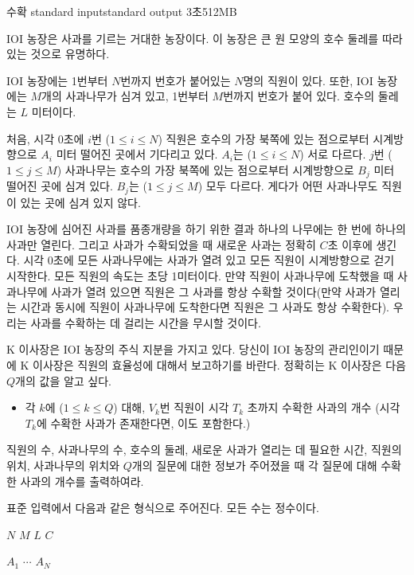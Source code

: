 \begin{problem}{수확}
	{standard input}{standard output}
	{3초}{512MB}{}
	
	IOI 농장은 사과를 기르는 거대한 농장이다. 이 농장은 큰 원 모양의 호수 둘레를 따라 있는 것으로 유명하다.
	
	IOI 농장에는 1번부터 $N$번까지 번호가 붙어있는 $N$명의 직원이 있다. 또한, IOI 농장에는 $M$개의 사과나무가 심겨 있고, 1번부터 $M$번까지 번호가 붙어 있다. 호수의 둘레는 $L$ 미터이다.
	
	처음, 시각 0초에 $i$번 ($1 \le i \le N$) 직원은 호수의 가장 북쪽에 있는 점으로부터 시계방향으로 $A_i$ 미터 떨어진 곳에서 기다리고 있다. $A_i$는 ($1 \le i \le N$) 서로 다르다. $j$번 ($1 \le j \le M$) 사과나무는 호수의 가장 북쪽에 있는 점으로부터 시계방향으로 $B_j$ 미터 떨어진 곳에 심겨 있다. $B_j$는 ($1 \le j \le M$) 모두 다르다. 게다가 어떤 사과나무도 직원이 있는 곳에 심겨 있지 않다.
	
	IOI 농장에 심어진 사과를 품종개량을 하기 위한 결과 하나의 나무에는 한 번에 하나의 사과만 열린다. 그리고 사과가 수확되었을 때 새로운 사과는 정확히 $C$초 이후에 생긴다. 시각 0초에 모든 사과나무에는 사과가 열려 있고 모든 직원이 시계방향으로 걷기 시작한다. 모든 직원의 속도는 초당 1미터이다. 만약 직원이 사과나무에 도착했을 때 사과나무에 사과가 열려 있으면 직원은 그 사과를 항상 수확할 것이다(만약 사과가 열리는 시간과 동시에 직원이 사과나무에 도착한다면 직원은 그 사과도 항상 수확한다). 우리는 사과를 수확하는 데 걸리는 시간을 무시할 것이다.
	
	K 이사장은 IOI 농장의 주식 지분을 가지고 있다. 당신이 IOI 농장의 관리인이기 때문에 K 이사장은 직원의 효율성에 대해서 보고하기를 바란다. 정확히는 K 이사장은 다음 $Q$개의 값을 알고 싶다.
	
	\begin{itemize}
		\item[] 각 $k$에 ($1 \le k \le Q$) 대해, $V_k$번 직원이 시각 $T_k$ 초까지 수확한 사과의 개수 (시각 $T_k$에 수확한 사과가 존재한다면, 이도 포함한다.)
	\end{itemize}
	
	직원의 수, 사과나무의 수, 호수의 둘레, 새로운 사과가 열리는 데 필요한 시간, 직원의 위치, 사과나무의 위치와 $Q$개의 질문에 대한 정보가 주어졌을 때 각 질문에 대해 수확한 사과의 개수를 출력하여라.
	
	
	\InputFile
	
	표준 입력에서 다음과 같은 형식으로 주어진다. 모든 수는 정수이다.
	
	$N$ $M$ $L$ $C$
	
	$A_1$ $\cdots$ $A_N$
	

\end{problem}
